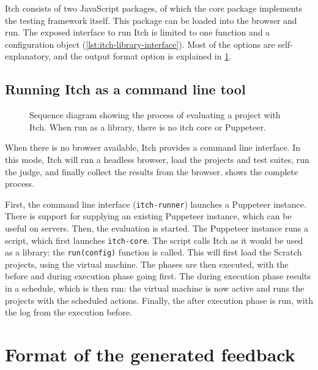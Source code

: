 \documentclass[../main]{subfiles}
\begin{document}
Itch consists of two JavaScript packages, of which the core package implements the testing framework itself.
This package can be loaded into the browser and run.
The exposed interface to run Itch is limited to one function and a configuration object (\cref{lst:itch-library-interface}).
Most of the options are self-explanatory, and the output format option is explained in \cref{sec:format-of-the-generated-feedback}.

\subsection{Running Itch as a command line tool}\label{subsec:running-itch-as-a-command-line-tool}

\begin{figure}
    \begin{wide}
        
    \end{wide}
    \caption{Sequence diagram showing the process of evaluating a project with Itch. When run as a library, there is no itch core or Puppeteer.}
    \label{fig:itch-sequence-diagram}
\end{figure}

When there is no browser available, Itch provides a command line interface.
In this mode, Itch will run a headless browser, load the projects and test suites, run the judge, and finally collect the results from the browser.
 shows the complete process.

First, the command line interface (\texttt{itch-runner}) launches a Puppeteer instance.
There is support for supplying an existing Puppeteer instance, which can be useful on servers.
Then, the evaluation is started.
The Puppeteer instance runs a script, which first launches \texttt{itch-core}.
The script calls Itch as it would be used as a library: the \texttt{run(config)} function is called.
This will first load the Scratch projects, using the virtual machine.
The phases are then executed, with the before and during execution phase going first.
The during execution phase results in a schedule, which is then run: the virtual machine is now active and runs the projects with the scheduled actions.
Finally, the after execution phase is run, with the log from the execution before.


\section{Format of the generated feedback}\label{sec:format-of-the-generated-feedback}
\end{document}
